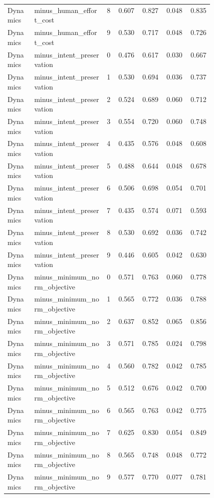 \documentclass{article}
\begin{document}
\begin{center}
\begin{longtable}{p{0.13\linewidth}p{0.35\linewidth}rrrrr}
Dynamics & minus\_human\_effort\_cost & 8 & 0.607 & 0.827 & 0.048 & 0.835\\
Dynamics & minus\_human\_effort\_cost & 9 & 0.530 & 0.717 & 0.048 & 0.726\\
Dynamics & minus\_intent\_preservation & 0 & 0.476 & 0.617 & 0.030 & 0.667\\
Dynamics & minus\_intent\_preservation & 1 & 0.530 & 0.694 & 0.036 & 0.737\\
Dynamics & minus\_intent\_preservation & 2 & 0.524 & 0.689 & 0.060 & 0.712\\
Dynamics & minus\_intent\_preservation & 3 & 0.554 & 0.720 & 0.060 & 0.748\\
Dynamics & minus\_intent\_preservation & 4 & 0.435 & 0.576 & 0.048 & 0.608\\
Dynamics & minus\_intent\_preservation & 5 & 0.488 & 0.644 & 0.048 & 0.678\\
Dynamics & minus\_intent\_preservation & 6 & 0.506 & 0.698 & 0.054 & 0.701\\
Dynamics & minus\_intent\_preservation & 7 & 0.435 & 0.574 & 0.071 & 0.593\\
Dynamics & minus\_intent\_preservation & 8 & 0.530 & 0.692 & 0.036 & 0.742\\
Dynamics & minus\_intent\_preservation & 9 & 0.446 & 0.605 & 0.042 & 0.630\\
Dynamics & minus\_minimum\_norm\_objective & 0 & 0.571 & 0.763 & 0.060 & 0.778\\
Dynamics & minus\_minimum\_norm\_objective & 1 & 0.565 & 0.772 & 0.036 & 0.788\\
Dynamics & minus\_minimum\_norm\_objective & 2 & 0.637 & 0.852 & 0.065 & 0.856\\
Dynamics & minus\_minimum\_norm\_objective & 3 & 0.571 & 0.785 & 0.024 & 0.798\\
Dynamics & minus\_minimum\_norm\_objective & 4 & 0.560 & 0.782 & 0.042 & 0.785\\
Dynamics & minus\_minimum\_norm\_objective & 5 & 0.512 & 0.676 & 0.042 & 0.700\\
Dynamics & minus\_minimum\_norm\_objective & 6 & 0.565 & 0.763 & 0.042 & 0.775\\
Dynamics & minus\_minimum\_norm\_objective & 7 & 0.625 & 0.830 & 0.054 & 0.849\\
Dynamics & minus\_minimum\_norm\_objective & 8 & 0.565 & 0.748 & 0.048 & 0.772\\
Dynamics & minus\_minimum\_norm\_objective & 9 & 0.577 & 0.770 & 0.077 & 0.781\\

\end{longtable}
\end{center}
\end{document}
